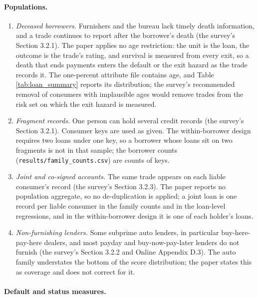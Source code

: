 \paragraph{Populations.}

\begin{enumerate}[resume]

\item \emph{Deceased borrowers.} Furnishers and the bureau lack timely death information, and a trade continues to report after the borrower's death (the survey's Section 3.2.1). The paper applies no age restriction: the unit is the loan, the outcome is the trade's rating, and survival is measured from every exit, so a death that ends payments enters the default or the exit hazard as the trade records it. The one-percent attribute file contains age, and Table \ref{tab:loan_summary} reports its distribution; the survey's recommended removal of consumers with implausible ages would remove trades from the risk set on which the exit hazard is measured.

\item \emph{Fragment records.} One person can hold several credit records (the survey's Section 3.2.1). Consumer keys are used as given. The within-borrower design requires two loans under one key, so a borrower whose loans sit on two fragments is not in that sample; the borrower counts (\texttt{results/family\_counts.csv}) are counts of keys.

\item \emph{Joint and co-signed accounts.} The same trade appears on each liable consumer's record (the survey's Section 3.2.3). The paper reports no population aggregate, so no de-duplication is applied; a joint loan is one record per liable consumer in the family counts and in the loan-level regressions, and in the within-borrower design it is one of each holder's loans.

\item \emph{Non-furnishing lenders.} Some subprime auto lenders, in particular buy-here-pay-here dealers, and most payday and buy-now-pay-later lenders do not furnish (the survey's Section 3.2.2 and Online Appendix D.3). The auto family understates the bottom of the score distribution; the paper states this as coverage and does not correct for it.

\end{enumerate}

\paragraph{Default and status measures.}

